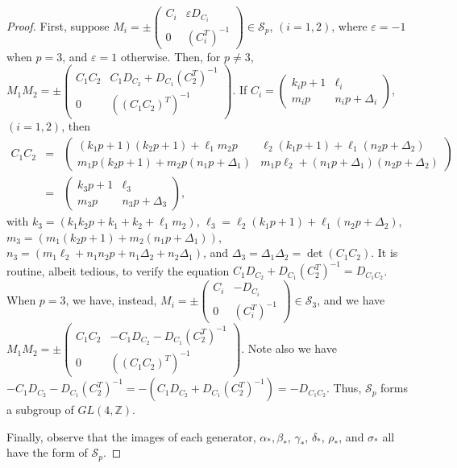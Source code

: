 \documentclass{amsart}     %
\theoremstyle{definition}
\begin{document}
\begin{proof}
First, suppose $M_i = \pm \begin{pmatrix} C_i & \varepsilon D_{C_i} \\ 0 & (C_i^T)^{-1} \end{pmatrix} \in \mathcal{S}_p$, $(i = 1, 2)$, where $\varepsilon = -1$ when $p=3$, and $\varepsilon=1$ otherwise. Then, for $p \neq 3$, $M_1 M_2 = \pm \begin{pmatrix} C_1C_2 & C_1 D_{C_2} + D_{C_1} \left(C_2^T\right)^{-1} \\ 0 & \left( \left( C_1 C_2 \right)^T \right)^{-1} \end{pmatrix}$. If $C_i = \begin{pmatrix} k_i p + 1 & \ell_i \\ m_i p & n_i p + \Delta_i \end{pmatrix}$, $(i = 1, 2)$, then 
\begin{eqnarray*} C_1 C_2 & = & \begin{pmatrix} (k_1 p + 1)(k_2 p + 1) + \ell_1 m_2 p & \ell_2 (k_1p + 1) + \ell_1 (n_2 p + \Delta_2) \\ m_1 p (k_2 p + 1) + m_2 p (n_1 p + \Delta_1) & m_1 p \ell_2 + (n_1p + \Delta_1)(n_2 p + \Delta_2) \end{pmatrix} \\
& = & \begin{pmatrix} k_3p + 1 &  \ell_3 \\ m_3 p & n_3 p + \Delta_3 \end{pmatrix}, \end{eqnarray*}
with $k_3 = (k_1 k_2 p + k_1 + k_2 + \ell_1 m_2)$, $\ell_3 = \ell_2 (k_1p + 1) + \ell_1 (n_2 p + \Delta_2)$, $m_3 = (m_1(k_2 p + 1) + m_2 ( n_1 p + \Delta_1))$, $n_3 = (m_1 \ell_2 + n_1 n_2 p + n_1 \Delta_2 + n_2 \Delta_1)$, and $\Delta_3 = \Delta_1 \Delta_2 = \det(C_1 C_2)$. It is routine, albeit tedious, to verify the equation $C_1 D_{C_2} + D_{C_1} \left(C_2^T\right)^{-1} = D_{C_1 C_2}$. When $p=3$, we have, instead, $M_i = \pm \begin{pmatrix} C_i & -D_{C_i} \\ 0 & (C_i^T)^{-1} \end{pmatrix} \in \mathcal{S}_3$, and we have $M_1 M_2 = \pm \begin{pmatrix} C_1C_2 & - C_1 D_{C_2} - D_{C_1} \left(C_2^T\right)^{-1} \\ 0 & \left( \left( C_1 C_2 \right)^T \right)^{-1} \end{pmatrix}$. Note also we have $- C_1 D_{C_2} - D_{C_1} \left(C_2^T\right)^{-1} = - \left( C_1 D_{C_2} + D_{C_1} \left(C_2^T\right)^{-1} \right) = -D_{C_1 C_2}$. Thus, $\mathcal{S}_p$ forms a subgroup of $GL(4, \mathbb{Z})$. 

Finally, observe that the images of each generator, $\alpha_*, \beta_*$, $\gamma_*$, $\delta_*$, $\rho_*$, and $\sigma_*$ all have the form of $\mathcal{S}_p$.
\end{proof}
\end{document}
